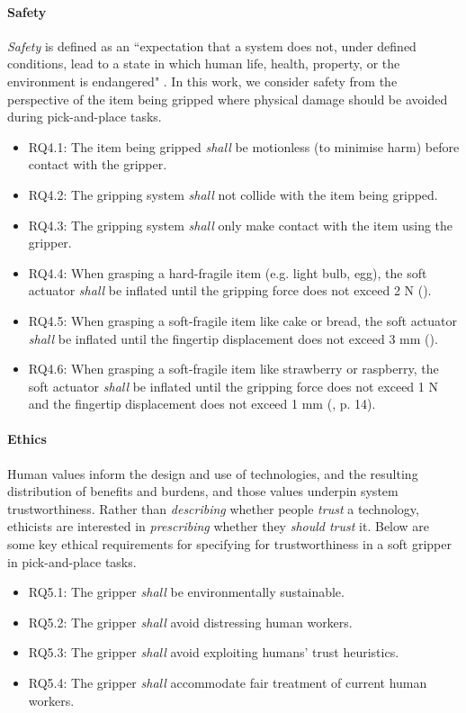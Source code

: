 \documentclass[letterpaper, 10 pt, conference]{ieeeconf}  %
\begin{document}
	\paragraph{\textbf{Safety}}\label{safety}
	\emph{Safety} is defined as an ``expectation that a system does not, under defined conditions, lead to a state in which human life, health, property, or the environment is endangered" \cite{ISO24765:2017}. 
	In this work, we consider safety from the perspective of the item being gripped where physical damage should be avoided during pick-and-place tasks. %
	\begin{itemize}
		\item RQ4.1: The item being gripped \emph{shall} be motionless (to minimise harm) before contact with the gripper. 
		\item RQ4.2: The gripping system \emph{shall} not collide with the item being gripped. 
		\item RQ4.3: The gripping system \emph{shall} only make contact with the item using the gripper.
		\item RQ4.4: When grasping a hard-fragile item (e.g. light bulb, egg), the soft actuator \emph{shall} be inflated until the gripping force does not exceed 2 N (\cite{Cheng2021}).
		\item RQ4.5: When grasping a soft-fragile item like cake or bread, the soft actuator \emph{shall} be inflated until the fingertip displacement does not exceed 3 mm (\cite{Cheng2021}).
		\item RQ4.6: When grasping a soft-fragile item like strawberry or raspberry, the soft actuator \emph{shall} be inflated until the gripping force does not exceed 1 N and the fingertip displacement does not exceed 1 mm (\cite{Cheng2021}, p. 14).
	\end{itemize}
	
	\paragraph{\textbf{Ethics}}\label{ethics}
	Human values inform the design and use of technologies, and the resulting distribution of benefits and burdens, and those values underpin system trustworthiness. Rather than \emph{describing} whether people \emph{trust} a technology, ethicists are interested in \emph{prescribing} whether they \emph{should trust} it. Below are some key ethical requirements for specifying for trustworthiness in a soft gripper in pick-and-place tasks.
	\begin{itemize}
		\item RQ5.1: The gripper \emph{shall} 
		be environmentally sustainable. 
		\item RQ5.2: The gripper \emph{shall} avoid distressing human workers.
		\item RQ5.3: The gripper \emph{shall} avoid exploiting humans' trust heuristics.
		\item RQ5.4: The gripper \emph{shall} accommodate fair treatment of current human workers.
	\end{itemize}
	
\end{document}
